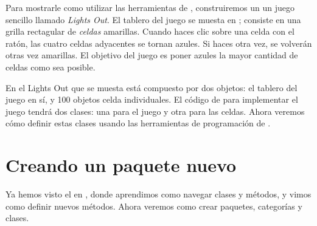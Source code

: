 \documentclass[a4paper,10pt,twoside]{book}
\begin{document}

Para mostrarle como utilizar las herramientas de \pharo, construiremos un un juego
sencillo llamado \emph{Lights Out}. El tablero del juego se muesta en ;
consiste en una grilla rectagular de \emph{celdas} amarillas. Cuando haces clic
sobre una celda con el rat\'on, las cuatro celdas adyacentes se tornan azules. Si
haces \Click otra vez, se volver\'an otras vez amarillas. El objetivo del juego
es poner azules la mayor cantidad de celdas como sea posible.


En el Lights Out que se muesta  est\'a compuesto por
dos objetos: el tablero del juego en s\'i, y 100 objetos celda individuales. El
c\'odigo de \pharo para implementar el juego tendr\'a dos clases: una para el
juego y otra para las celdas. Ahora veremos c\'omo definir estas clases usando
las herramientas de programaci\'on de \pharo.

\section{Creando un paquete nuevo}


Ya hemos visto el  en , donde aprendimos como
navegar clases y m\'etodos, y vimos como definir nuevos m\'etodos. Ahora veremos
como crear paquetes, categor\'ias y clases.

\end{document}
